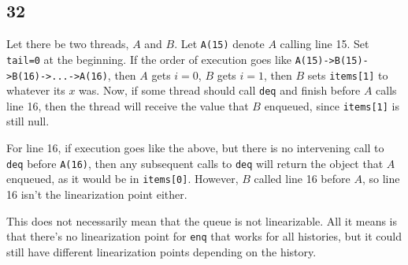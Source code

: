 \documentclass{article}
\begin{document}
\subsection*{32}
Let there be two threads, $A$ and $B$. Let \verb|A(15)| denote $A$ calling line 15. Set \verb|tail=0| at the beginning. If the order of execution goes like \verb|A(15)->B(15)->B(16)->...->A(16)|, then $A$ gets $i=0$, $B$ gets $i=1$, then $B$ sets \verb|items[1]| to whatever its $x$ was. Now, if some thread should call \verb|deq| and finish before $A$ calls line 16, then the thread will receive the value that $B$ enqueued, since \verb|items[1]| is still null. 

For line 16, if execution goes like the above, but there is no intervening call to \verb|deq| before \verb|A(16)|, then any subsequent calls to \verb|deq| will return the object that $A$ enqueued, as it would be in \verb|items[0]|. However, $B$ called line 16 before $A$, so line 16 isn't the linearization point either.

This does not necessarily mean that the queue is not linearizable. All it means is that there's no linearization point for \verb|enq| that works for all histories, but it could still have different linearization points depending on the history.
\end{document}

